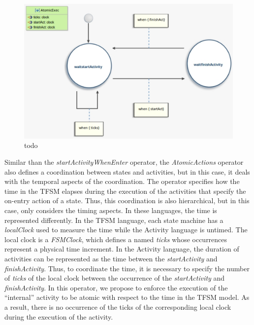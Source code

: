 \begin{figure}
	\center
	\includegraphics[width=.7\columnwidth]{examples/figs/AtomicExec}
	\caption{todo}
	\label{fig:atomicexec}
\end{figure}



Similar than the \emph{startActivityWhenEnter} operator, the \emph{AtomicActions} operator also defines a coordination between states and activities, but in this case, it deals with the temporal aspects of the coordination. The operator specifies how the time in the TFSM elapses during the execution of the activities that specify the on-entry action of a state. Thus, this coordination is also hierarchical, but in this case, only considers the timing aspects. In these languages, the time is represented differently. In the TFSM language, each state machine has a \emph{localClock} used to measure the time while the Activity language is untimed. The local clock is a \emph{FSMClock}, which defines a \dse named \emph{ticks} whose occurrences represent a physical time increment. In the Activity language, the duration of activities can be represented as the time between the \dse \emph{startActivity} and \dse \emph{finishActivity}. Thus, to coordinate the time, it is necessary to specify the number of \emph{ticks} of the local clock between the occurrence of the \dse \emph{startActivity} and \emph{finishActivity}. In this operator, we propose to enforce the execution of the ``internal'' activity to be atomic with respect to the time in the TFSM model. As a result, there is no occurrence of the \dse ticks of the corresponding local clock during the execution of the activity. 

